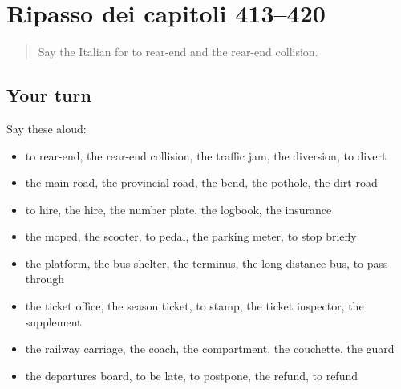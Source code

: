 \section[(dialogue)]{Ripasso dei capitoli 413–420}

\label{lesson:IT-R420-ripasso-413-420}



\begin{quote}
Say the Italian for to rear-end and the rear-end collision.
\end{quote}

\subsection*{Your turn}
Say these aloud:

\begin{itemize}
\raggedright
  \item to rear-end, the rear-end collision, the traffic jam, the diversion, to divert
  \item the main road, the provincial road, the bend, the pothole, the dirt road
  \item to hire, the hire, the number plate, the logbook, the insurance
  \item the moped, the scooter, to pedal, the parking meter, to stop briefly
  \item the platform, the bus shelter, the terminus, the long-distance bus, to pass through
  \item the ticket office, the season ticket, to stamp, the ticket inspector, the supplement
  \item the railway carriage, the coach, the compartment, the couchette, the guard
  \item the departures board, to be late, to postpone, the refund, to refund
\end{itemize}

